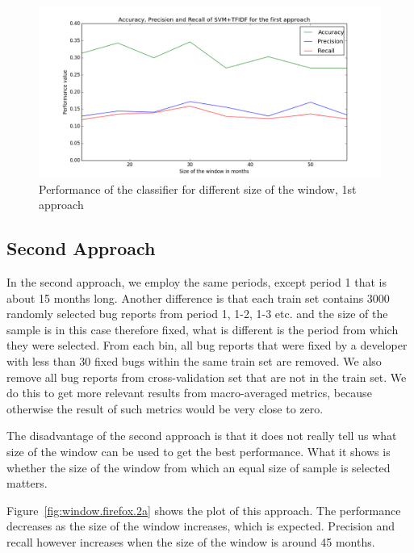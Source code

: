\begin{figure}[htbp]
    \centering
        \includegraphics[width=\textwidth]{./images/window_size/firefox_1a.png}
    \caption{Performance of the classifier for different size of the window, 1st approach}
    \label{fig:window.firefox.1a}
\end{figure}

\subsection{Second Approach}

In the second approach, we employ the same periods, except period 1 that is about 15 months long. Another difference is that each train set contains 3000 randomly selected bug reports from period 1, 1-2, 1-3 etc. and the size of the sample is in this case therefore fixed, what is different is the period from which they were selected. From each bin, all bug reports that were fixed by a developer with less than 30 fixed bugs within the same train set are removed. We also remove all bug reports from cross-validation set that are not in the train set. We do this to get more relevant results from macro-averaged metrics, because otherwise the result of such metrics would be very close to zero.

The disadvantage of the second approach is that it does not really tell us what size of the window can be used to get the best performance. What it shows is whether the size of the window from which an equal size of sample is selected matters.

Figure~\ref{fig:window.firefox.2a} shows the plot of this approach. The performance decreases as the size of the window increases, which is expected. Precision and recall however increases when the size of the window is around 45 months.~

